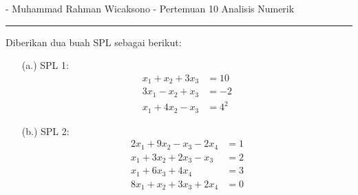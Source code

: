\documentclass[12pt]{article}
\begin{document}
 - Muhammad Rahman Wicaksono - Pertemuan 10 Analisis Numerik\\
\noindent\rule{\textwidth}{0.2pt}\bigbreak

\noindent Diberikan dua buah SPL sebagai berikut:
\begin{enumerate}
    \item [(a.)]{
        SPL 1:
        \begin{align*}
            x_1 + x_2 + 3x_3    & = 10 \\
            3x_1 - x_2 + x_3    & = -2 \\
            x_1 + 4x_2 - x_3    & = 4^2
        \end{align*}
    }
    \item [(b.)]{
        SPL 2:
        \begin{align*}
            2x_1 + 9x_2 - x_3 - 2x_4    & = 1 \\
            x_1 + 3x_2 + 2x_3 - x_3     & = 2 \\
            x_1 + 6x_3 + 4x_4           & = 3 \\
            8x_1 + x_2 + 3x_3 + 2x_4    & = 0
        \end{align*}
    }
\end{enumerate}
\end{document}
